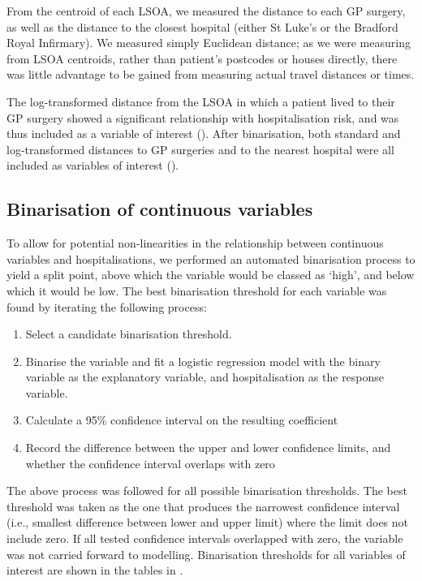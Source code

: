 From the centroid of each LSOA, we measured the distance to each GP surgery, as well as the distance to the closest hospital (either St Luke's or the Bradford Royal Infirmary). We measured simply Euclidean distance; as we were measuring from LSOA centroids, rather than patient's postcodes or houses directly, there was little advantage to be gained from measuring actual travel distances or times.

The log-transformed distance from the LSOA in which a patient lived to their GP surgery showed a significant relationship with hospitalisation risk, and was thus included as a variable of interest (). After binarisation, both standard and log-transformed distances to GP surgeries and to the nearest hospital were all included as variables of interest ().

\subsection{Binarisation of continuous variables}
\label{sec-additional-binarisation}

To allow for potential non-linearities in the relationship between continuous variables and hospitalisations, we performed an automated binarisation process to yield a split point, above which the variable would be classed as `high', and below which it would be low. The best binarisation threshold for each variable was found by iterating the following process:

\begin{enumerate}
\item Select a candidate binarisation threshold.
\item Binarise the variable and fit a logistic regression model with the binary variable as the explanatory variable, and hospitalisation as the response variable.
\item Calculate a 95\% confidence interval on the resulting coefficient
\item Record the difference between the upper and lower confidence limits, and whether the confidence interval overlaps with zero 
\end{enumerate}

The above process was followed for all possible binarisation thresholds. The best threshold was taken as the one that produces the narrowest confidence interval (i.e., smallest difference between lower and upper limit) where the limit does not include zero. If all tested confidence intervals overlapped with zero, the variable was not carried forward to modelling. Binarisation thresholds for all variables of interest are shown in the tables in .

